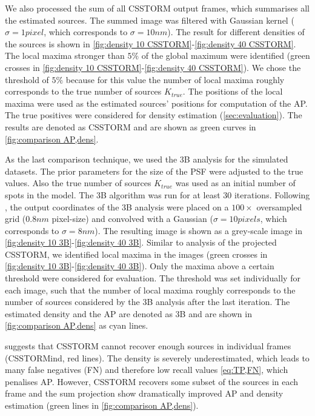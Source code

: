 We also processed the sum of all CSSTORM output frames, which summarises all the estimated sources. The summed image was filtered with Gaussian kernel ($\sigma=1\unit{pixel}$, which corresponds to $\sigma=10\unit{nm}$). The result for different densities of the sources is shown in \autoref{fig:density 10 CSSTORM}-\ref{fig:density 40 CSSTORM}. The local maxima stronger than $5\%$ of the global maximum were identified (green crosses in \autoref{fig:density 10 CSSTORM}-\ref{fig:density 40 CSSTORM}). We chose the threshold of $5\%$ because for this value the number of local maxima roughly corresponds to the true number of sources $K_{true}$. The positions of the local maxima were used as the estimated sources' positions for computation of the AP. The true positives were considered for density estimation (\autoref{sec:evaluation}). The results are denoted as \textsf{CSSTORM} and are shown as green curves in \autoref{fig:comparison AP,dens}.

As the last comparison technique, we used the 3B analysis for the simulated datasets. The prior parameters for the size of the PSF were adjusted to the true values. Also the true number of sources $K_{true}$ was used as an initial number of spots in the model. The 3B algorithm was run for at least 30 iterations. Following \cite{Cox2011}, the output coordinates of the 3B analysis were placed on a $100\times$ oversampled grid ($0.8\unit{nm}$ pixel-size) and convolved with a Gaussian ($\sigma=10\unit{pixels}$, which corresponds to $\sigma=8\unit{nm}$). The resulting image is shown as a grey-scale image in \autoref{fig:density 10 3B}-\ref{fig:density 40 3B}. Similar to analysis of the projected CSSTORM, we identified local maxima in the images (green crosses in \autoref{fig:density 10 3B}-\ref{fig:density 40 3B}). Only the maxima above a certain threshold were considered for evaluation. The threshold was set individually for each image, such that the number of local maxima roughly corresponds to the number of sources considered by the 3B analysis after the last iteration. The estimated density and the AP are denoted as \textsf{3B} and are shown in \autoref{fig:comparison AP,dens} as cyan lines. 

 suggests that CSSTORM cannot recover enough sources in individual frames (\textsf{CSSTORMind}, red lines). The density is severely underestimated, which leads to many false negatives (FN) and therefore low recall values \autoref{eq:TP,FN}, which penalises AP. However, CSSTORM recovers some subset of the sources in each frame and the sum projection show dramatically improved AP and density estimation (green lines in \autoref{fig:comparison AP,dens}). 

